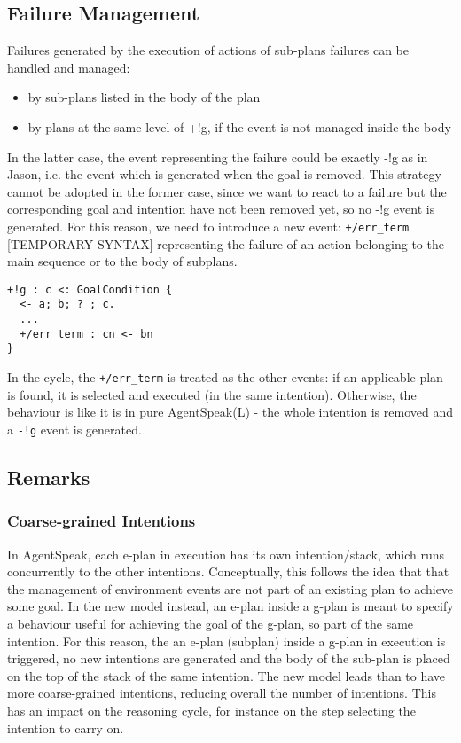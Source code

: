\subsection{Failure Management}

Failures generated by the execution of actions of sub-plans failures can be handled and managed:

\begin{itemize}
\item by sub-plans listed in the body of the plan
\item by plans at the same level of +!g, if the event is not managed inside the body
\end{itemize}

\noindent In the latter case, the event representing the failure could be exactly -!g as in Jason, i.e. the event which is generated when the goal is removed.
%
This strategy cannot be adopted in the former case, since we want to react to a failure but the corresponding goal and intention have not been removed yet, so no -!g event is generated. For this reason, we need to introduce a new event:  \texttt{+/err\_term}  [TEMPORARY SYNTAX]  representing the failure of an action belonging to the main sequence or to the body of subplans.  

{\small
\begin{verbatim}
+!g : c <: GoalCondition {
  <- a; b; ? ; c. 
  ...
  +/err_term : cn <- bn
}
\end{verbatim}}

\noindent In the cycle, the \texttt{+/err\_term} is treated as the other events: if an applicable plan is found, it is selected and executed (in the same intention). 
%
Otherwise, the behaviour is like it is in pure AgentSpeak(L) - the whole intention is removed and a \texttt{-!g} event is generated.

\subsection{Remarks}

\subsubsection{Coarse-grained Intentions}

In AgentSpeak, each e-plan in execution has its own intention/stack, which runs concurrently to the other intentions. Conceptually, this follows the idea that that the management of environment events are not part of an existing plan to achieve some goal.
%
In the new model instead, an e-plan inside a g-plan is meant to specify a behaviour useful for achieving the goal of the g-plan, so part of the same intention.
%
For this reason, the an e-plan (subplan) inside a g-plan in execution is triggered, no new intentions are generated and the body of the sub-plan is placed on the top of the stack of the same intention. 
%
The new model leads than to have more coarse-grained intentions, reducing overall the number of intentions. This has an impact on the reasoning cycle, for instance on the step selecting the intention to carry on.

